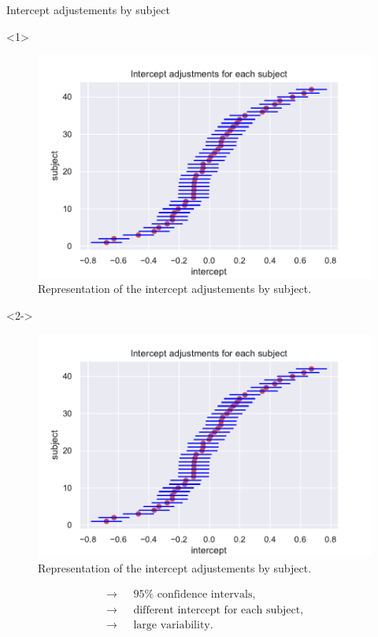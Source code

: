 \documentclass[unknownkeysallowed]{beamer}
\begin{document}
\begin{frame}{Intercept adjustements by subject}
\begin{onlyenv}<1>
\vspace{-0.5cm}
\begin{figure}[H]
    \centering
    \includegraphics[scale=.45]{./images/model1_inter.pdf}
    \caption{Representation of the intercept adjustements by subject.}
\end{figure}
\end{onlyenv}
\begin{onlyenv}<2->
\begin{figure}[H]
    \centering
    \includegraphics[scale=.45]{./images/model1_inter.pdf}
    \caption{Representation of the intercept adjustements by subject.}
\end{figure}
\begin{align*}
    \longrightarrow \text{ }& 95\% \text{ confidence intervals},\\
    \longrightarrow \text{ }& \text{different intercept for each subject},\\
    \longrightarrow \text{ }& \text{large variability}.
\end{align*}
\end{onlyenv}
\end{frame}
\end{document}
